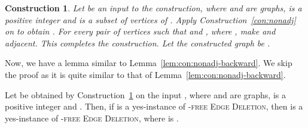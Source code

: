 \documentclass[envcountsame,envcountsect,10pt,oribibl]{llncs}
\newcommand{\pname}[1]{\textnormal{\textsc{#1}}}
\newcommand{\HED}{\pname{-free Edge Deletion}}
\newcommand{\HDED}{\pname{-free Edge Deletion}}
\newtheorem{construction}{Construction}
\begin{document}
\begin{construction}
  \label{con:adj}
  Let  be an input to the construction, where  and  are graphs, 
  is a positive integer and  is a subset of vertices of .
  Apply Construction~\ref{con:nonadj} on  to obtain .
  For every pair of vertices  such that  and , where ,
  make  and  adjacent.
  This completes the construction. Let the constructed graph be . 
\end{construction}

Now, we have a lemma similar to Lemma~\ref{lem:con:nonadj-backward}. 
We skip the proof as it is quite similar to that of Lemma~\ref{lem:con:nonadj-backward}. 

\begin{lemma}
  \label{lem:con:adj-backward}
  Let  be obtained by Construction~\ref{con:adj} on 
  the input , where  and  are graphs,  is a positive integer and .
  Then, if  is a yes-instance of \HED, then  is a yes-instance of \HDED, where  is .
\end{lemma}
\end{document}
